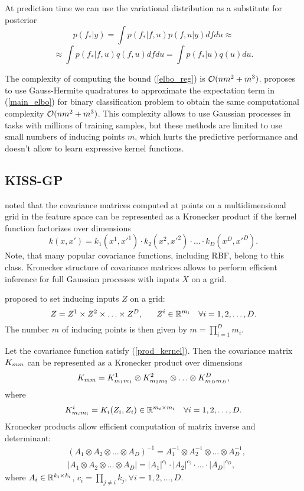   At prediction time we can use the variational distribution as a substitute for
  posterior
  \[
    p(f_* | y) = \int p(f_*| f, u) p(f, u |y) d f d u \approx
  \]
  \[
    \approx \int p(f_* | f, u) q(f, u) d f d u = \int p(f_* | u) q(u) du.
  \]

  The complexity of computing the bound (\ref{elbo_reg}) is $\mathcal{O}(n m^2 + m^3)$.
  \citet{hensman2015} proposes to use Gauss-Hermite quadratures to approximate the
  expectation term in (\ref{main_elbo}) for binary classification problem to
  obtain the same computational complexity $\mathcal{O}(nm^2 + m^3)$. This complexity
  allows to use Gaussian processes in tasks with millions of training samples,
  but these methods are limited to use small numbers of inducing points $m$,
  which hurts the predictive performance and doesn't allow to learn expressive
  kernel functions.

\subsection{KISS-GP}
\label{kiss_gp}

  \citet{saatci2012} noted that the covariance matrices computed at points on a
  multidimensional grid in the feature space can be represented as a Kronecker
  product if the kernel function factorizes over dimensions
  \begin{equation}
  \label{prod_kernel}
    k(x, x') = k_1(x^1, x'^1)\cdot k_2(x^2, x'^2)\cdot \ldots\cdot k_D(x^D, x'^D).
  \end{equation}
  Note, that many popular covariance functions, including RBF, belong to this class.
  Kronecker structure of covariance matrices allows to perform efficient inference
  for full Gaussian processes with inputs $X$ on a grid.

  \citet{wilson2015} proposed to set inducing inputs $Z$ on a grid:
  \[
    Z = Z^1 \times Z^2 \times \ldots \times Z^D,~~~~~Z^i \in \mathbb{R}^{m_i}~~~\forall i = 1, 2, \ldots, D.
  \]
  The number $m$ of inducing points is then given by $m = \prod_{i=1}^D m_{i}$.

  Let the covariance function satisfy (\ref{prod_kernel}). Then the covariance
  matrix $K_{mm}$ can be represented as a Kronecker product over dimensions
  \[
    K_{mm} = K_{m_1 m_1}^1 \otimes K^2_{m_2 m_2} \otimes \ldots \otimes
    K^D_{m_D m_D},
  \]
  where
  \[
    K^i_{m_i m_i} = K_i(Z_i, Z_i) \in \mathbb{R}^{m_i \times m_i}~~~\forall i = 1, 2, \ldots, D.
  \]
  Kronecker products allow efficient computation of matrix inverse and determinant:
  \begin{align*}
    &(A_1 \otimes A_2 \otimes \ldots \otimes A_D)^{-1} = A_1^{-1} \otimes A_2^{-1} \otimes \ldots \otimes A_D^{-1},\\
    &|A_1 \otimes A_2 \otimes \ldots \otimes A_D| = |A_1|^{c_1} \cdot |A_2|^{c_2} \cdot \ldots \cdot |A_D|^{c_D},
  \end{align*}
  where $A_i\in\mathbb{R}^{k_i \times k_i}$, $c_i = \prod_{j \ne i} k_j,\forall i = 1, 2, \ldots, D$.
  
